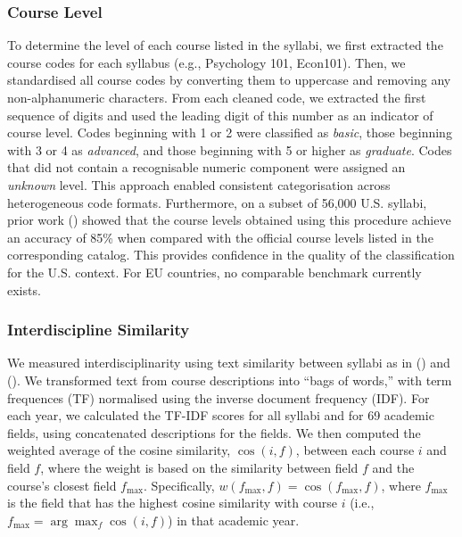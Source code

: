 \documentclass[
  british,
  11pt,
]{article}
\begin{document}
\subsubsection{Course Level}\label{course-level}

To determine the level of each course listed in the syllabi, we first extracted the course codes for each syllabus (e.g., Psychology 101, Econ101). Then, we standardised all course codes by converting them to uppercase and removing any non-alphanumeric characters. From each cleaned code, we extracted the first sequence of digits and used the leading digit of this number as an indicator of course level. Codes beginning with 1 or 2 were classified as \emph{basic}, those beginning with 3 or 4 as \emph{advanced}, and those beginning with 5 or higher as \emph{graduate}. Codes that did not contain a recognisable numeric component were assigned an \emph{unknown} level. This approach enabled consistent categorisation across heterogeneous code formats. Furthermore, on a subset of 56,000 U.S. syllabi, prior work () showed that the course levels obtained using this procedure achieve an accuracy of 85\% when compared with the official course levels listed in the corresponding catalog. This provides confidence in the quality of the classification for the U.S. context. For EU countries, no comparable benchmark currently exists.

\subsubsection{Interdiscipline Similarity}\label{si-interdisciplinarity}

We measured interdisciplinarity using text similarity between syllabi as in () and (). We transformed text from course descriptions into ``bags of words,'' with term frequences (TF) normalised using the inverse document frequency (IDF). For each year, we calculated the TF-IDF scores for all syllabi and for 69 academic fields, using concatenated descriptions for the fields. We then computed the weighted average of the cosine similarity, \(\cos (i, f)\), between each course \(i\) and field \(f\), where the weight is based on the similarity between field \(f\) and the course's closest field \(f_{\max}\). Specifically, \(w(f_{\max}, f) = \cos(f_{\max}, f)\), where \(f_{\max}\) is the field that has the highest cosine similarity with course \(i\) (i.e., \(f_{\max} = \arg\max_f \cos(i, f)\)) in that academic year.
\end{document}
